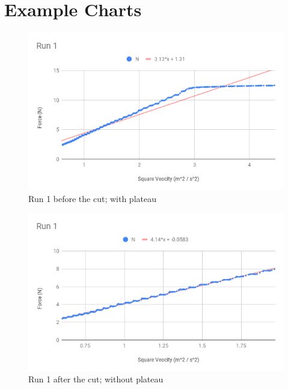 \section{Example Charts}
%
\begin{figure}[ht]
    \centering
    \includegraphics[scale=0.71]{image/10-centripetal/Run1BeforeCut.png}
    \caption{Run 1 before the cut; with plateau}
    \label{figure.10.run.1.before}
\end{figure}
%
\begin{figure}[ht]
    \centering
    \includegraphics[scale=0.71]{image/10-centripetal/Run1.png}
    \caption{Run 1 after the cut; without plateau}
    \label{figure.10.run.1}
\end{figure}
%